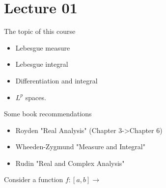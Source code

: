 \section{Lecture 01}
The topic of this course
\begin{itemize}
  \item Lebesgue measure
  \item Lebesgue integral
   \item Differentiation and integral
   \item $L^{p}$ spaces.
\end{itemize}
Some book recommendations
\begin{itemize}
  \item Royden "Real Analysis" (Chapter 3->Chapter 6)
  \item Wheeden-Zygmund "Measure and Integral"
  \item Rudin "Real and Complex Analysis"
\end{itemize}
Consider a function $f:[a,b]\to $

